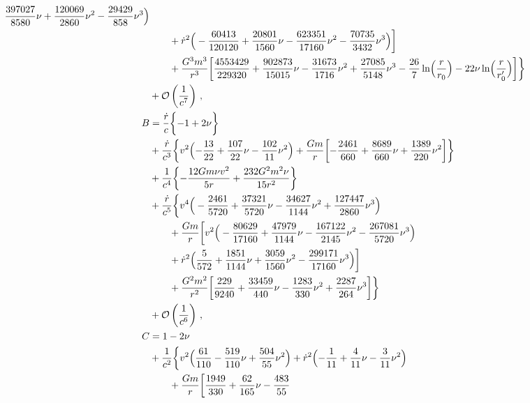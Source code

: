 \documentclass[prd,preprint,superscriptaddress,tightenlines,nofootinbib,
  eqsecnum,showpacs]{revtex4}
\begin{document}
\begin{subequations}
\begin{align}
  \frac{397027}{8580} \nu + \frac{120069}{2860} \nu^2 -
  \frac{29429}{858} \nu^3\Big)\nonumber\\ & \qquad + \dot{r}^2 \Big(-
  \frac{60413}{120120} + \frac{20801}{1560} \nu - \frac{623351}{17160}
  \nu^2 - \frac{70735}{3432} \nu^3\Big) \biggr]\nonumber\\ & \qquad +
\frac{G^3 m^3}{r^3} \biggl[\frac{4553429}{229320} +
  \frac{902873}{15015} \nu - \frac{31673}{1716} \nu^2 +
  \frac{27085}{5148} \nu^3 - \frac{26}{7} \ln
  \Bigl(\frac{r}{r_0}\Bigr) - 22 \nu \ln
  \Bigl(\frac{r}{r'_{0}}\Bigr)\biggr] \biggr\}\nonumber\\ & +
\mathcal{O}\left(\frac{1}{c^7}\right)\,,\\
B &= \frac{\dot{r}}{c} \biggl\{-1 + 2 \nu\biggr\} \nonumber\\ & +
\frac{\dot{r}}{c^3} \biggl\{v^2 \Bigl(- \frac{13}{22} + \frac{107}{22}
\nu - \frac{102}{11} \nu^2\Bigr) + \frac{G m}{r} \biggl[-
  \frac{2461}{660} + \frac{8689}{660} \nu + \frac{1389}{220}
  \nu^2\biggr]\biggr\}\nonumber\\ & + \frac{1}{c^{4}} \biggl\{ -
\frac{12 G m \nu v^2}{5 r}+\frac{232 G^2 m^2 \nu}{15 r^2}\biggr\}
\nonumber\\ & + \frac{\dot{r}}{c^{5}} \biggl\{ v^4 \Big(-
\frac{2461}{5720} + \frac{37321}{5720} \nu - \frac{34627}{1144} \nu^2
+ \frac{127447}{2860} \nu^3\Big)\nonumber\\ & \qquad + \frac{G m}{r}
\bigg[ v^2 \Big(- \frac{80629}{17160} + \frac{47979}{1144} \nu -
  \frac{167122}{2145} \nu^2 - \frac{267081}{5720}
  \nu^3\Big)\nonumber\\ & \qquad + \dot{r}^2 \Bigl(\frac{5}{572} +
  \frac{1851}{1144} \nu + \frac{3059}{1560} \nu^2 -
  \frac{299171}{17160} \nu^3\Bigr) \bigg]\nonumber\\ & \qquad +
\frac{G^2 m^2}{r^2} \bigg[\frac{229}{9240} + \frac{33459}{440} \nu -
  \frac{1283}{330} \nu^2 + \frac{2287}{264} \nu^3 \bigg]
\biggr\}\nonumber\\ & + \mathcal{O}\left(\frac{1}{c^6}\right)\,,\\
C &= 1 - 2 \nu \nonumber\\ & + \frac{1}{c^{2}} \biggl\{v^2
\Bigl(\frac{61}{110} - \frac{519}{110} \nu + \frac{504}{55}
\nu^2\Bigr) + \dot{r}^2 \Bigl(- \frac{1}{11} + \frac{4}{11} \nu -
\frac{3}{11} \nu^2\Bigr) \nonumber\\ & \qquad + \frac{G m}{r}
\biggl[\frac{1949}{330}+ \frac{62}{165} \nu - \frac{483}{55}

\end{align}
\end{subequations}
\end{document}
